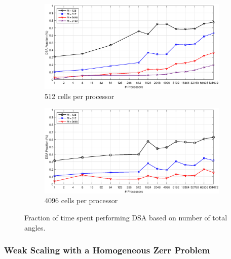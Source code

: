 \begin{figure}
\centering
{
	\begin{subfigure}[b]{\textwidth}
		\centering
		\includegraphics[width=\textwidth]{figures/sec_DSA/C512.eps}
		\caption{512 cells per processor}
	\end{subfigure}
}
	\vspace{1cm}
{
	\begin{subfigure}[b]{\textwidth}
		\centering
		\includegraphics[width=\textwidth]{figures/sec_DSA/C4096.eps}
		\caption{4096 cells per processor}
	\end{subfigure}
}
\caption{Fraction of time spent performing DSA based on number of total angles.}
\label{fig::DSA_Scaling_DSAFrac}
\end{figure}

\iffalse
\subsubsection{Weak Scaling with a Homogeneous Zerr Problem}
\label{sec::DSA_Results_Scaling_Zerr}


